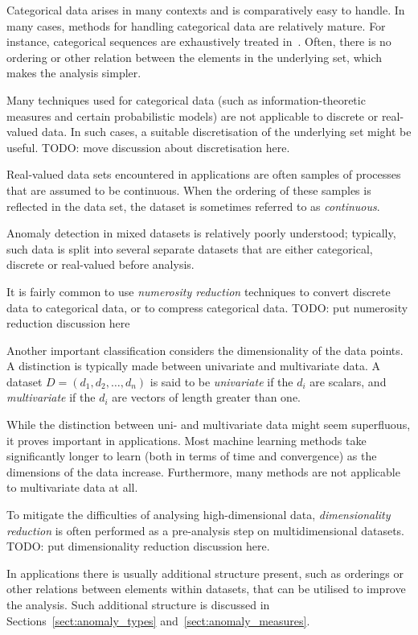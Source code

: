 Categorical data arises in many contexts and is comparatively easy to handle. In many cases, methods for handling categorical data are relatively mature. For instance, categorical sequences are exhaustively treated in~\cite{TODO}. Often, there is no ordering or other relation between the elements in the underlying set, which makes the analysis simpler.

Many techniques used for categorical data (such as information-theoretic measures and certain probabilistic models) are not applicable to discrete or real-valued data. In such cases, a suitable discretisation of the underlying set might be useful. TODO: move discussion about discretisation here.

Real-valued data sets encountered in applications are often samples of processes that are assumed to be continuous. When the ordering of these samples is reflected in the data set, the dataset is sometimes referred to as \emph{continuous}.

Anomaly detection in mixed datasets is relatively poorly understood; typically, such data is split into several separate datasets that are either categorical, discrete or real-valued before analysis.

It is fairly common to use \emph{numerosity reduction} techniques to convert discrete data to categorical data, or to compress categorical data. TODO: put numerosity reduction discussion here

Another important classification considers the dimensionality of the data points. A distinction is typically made between univariate and multivariate data. A dataset $D = (d_1, d_2, \dots, d_n)$ is said to be \emph{univariate} if the $d_i$ are scalars, and \emph{multivariate} if the $d_i$ are vectors of length greater than one.

While the distinction between uni- and multivariate data might seem superfluous, it proves important in applications. Most machine learning methods take significantly longer to learn (both in terms of time and convergence) as the dimensions of the data increase. Furthermore, many methods are not applicable to multivariate data at all.

To mitigate the difficulties of analysing high-dimensional data, \emph{dimensionality reduction} is often performed as a pre-analysis step on multidimensional datasets. TODO: put dimensionality reduction discussion here.

In applications there is usually additional structure present, such as orderings or other relations between elements within datasets, that can be utilised to improve the analysis. Such additional structure is discussed in Sections~\ref{sect:anomaly_types} and~\ref{sect:anomaly_measures}.

